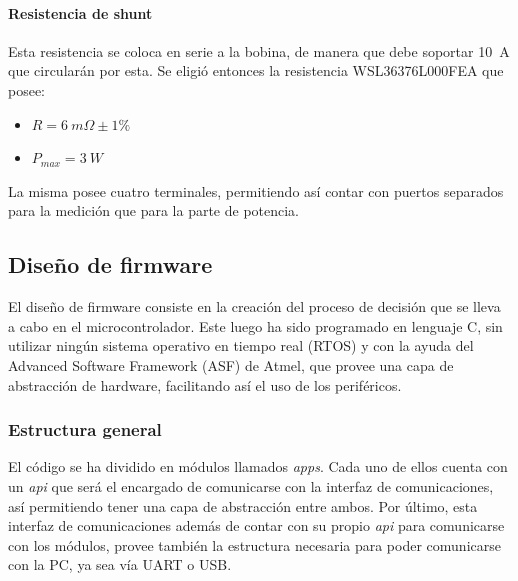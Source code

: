 \documentclass[titlepage, 12pt]{article}
\begin{document}
\paragraph{Resistencia de shunt}
Esta resistencia se coloca en serie a la bobina, de manera que debe soportar \SI{10}{A} que circularán por esta. Se eligió entonces la resistencia WSL36376L000FEA que posee:
    \begin{itemize}
        \item $R = \SI{6}{m\Omega} \pm 1\%$
        \item $P_{max} = \SI{3}{W}$
    \end{itemize}

La misma posee cuatro terminales, permitiendo así contar con puertos separados para la medición que para la parte de potencia.


\subsection{Diseño de firmware}
El diseño de firmware consiste en la creación del proceso de decisión que se lleva a cabo en el microcontrolador. Este luego ha sido programado en lenguaje C, sin utilizar ningún sistema operativo en tiempo real (RTOS) y con la ayuda del Advanced Software Framework (ASF) de Atmel, que provee una capa de abstracción de hardware, facilitando así el uso de los periféricos.

\subsubsection{Estructura general}
El código se ha dividido en módulos llamados \textit{apps}. Cada uno de ellos cuenta con un \textit{api} que será el encargado de comunicarse con la interfaz de comunicaciones, así permitiendo tener una capa de abstracción entre ambos. Por último, esta interfaz de comunicaciones además de contar con su propio \textit{api} para comunicarse con los módulos, provee también la estructura necesaria para poder comunicarse con la PC, ya sea vía UART o USB.
\end{document}
